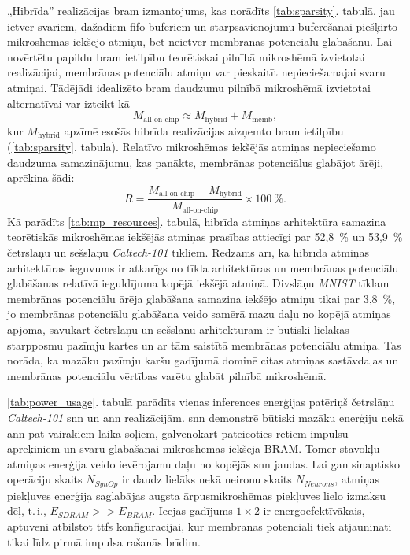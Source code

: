 „Hibrīda” realizācijas \Gls{bram} izmantojums, kas norādīts \ref{tab:sparsity}. tabulā, jau ietver svariem, dažādiem
\Gls{fifo} buferiem un starpsavienojumu buferēšanai piešķirto mikroshēmas iekšējo atmiņu, bet neietver membrānas potenciālu
glabāšanu. Lai novērtētu papildu \Gls{bram} ietilpību teorētiskai pilnībā mikroshēmā izvietotai realizācijai, membrānas
potenciālu atmiņu var pieskaitīt nepieciešamajai svaru atmiņai. Tādējādi idealizēto \Gls{bram} daudzumu pilnībā mikroshēmā
izvietotai alternatīvai var izteikt kā
\begin{equation}
  M_{\mathrm{all\mbox{-}on\mbox{-}chip}}
  \approx M_{\mathrm{hybrid}} + M_{\mathrm{memb}},
\end{equation}
kur \(M_{\mathrm{hybrid}}\) apzīmē esošās hibrīda realizācijas aizņemto \Gls{bram} ietilpību (\ref{tab:sparsity}. tabula).
Relatīvo mikroshēmas iekšējās atmiņas nepieciešamo daudzuma samazinājumu, kas panākts, membrānas potenciālus glabājot ārēji, aprēķina šādi:
\begin{equation}
  R =
  \frac{M_{\mathrm{all\mbox{-}on\mbox{-}chip}} - M_{\mathrm{hybrid}}}
       {M_{\mathrm{all\mbox{-}on\mbox{-}chip}}}
  \times 100~\%.
\end{equation}
Kā parādīts \ref{tab:mp_resources}. tabulā, hibrīda atmiņas arhitektūra samazina teorētiskās mikroshēmas iekšējās atmiņas
prasības attiecīgi par 52,8~\% un 53,9~\% četrslāņu un sešslāņu \textit{Caltech-101} tīkliem. Redzams arī, ka hibrīda atmiņas
arhitektūras ieguvums ir atkarīgs no tīkla arhitektūras un membrānas potenciālu glabāšanas relatīvā ieguldījuma kopējā
iekšējā atmiņā. Divslāņu \textit{MNIST} tīklam membrānas potenciālu ārēja glabāšana samazina iekšējo atmiņu tikai par 3,8~\%,
jo membrānas potenciālu glabāšana veido samērā mazu daļu no kopējā atmiņas apjoma, savukārt četrslāņu un sešslāņu
arhitektūrām ir būtiski lielākas starpposmu pazīmju kartes un ar tām saistītā membrānas potenciālu atmiņa. Tas norāda, ka
mazāku pazīmju karšu gadījumā dominē citas atmiņas sastāvdaļas un membrānas potenciālu vērtības varētu glabāt pilnībā
mikroshēmā.

\ref{tab:power_usage}. tabulā parādīts vienas inferences enerģijas patēriņš četrslāņu \textit{Caltech-101} \Gls{snn} un
\Gls{ann} realizācijām. \Gls{snn} demonstrē būtiski mazāku enerģiju nekā \Gls{ann} pat vairākiem laika soļiem, galvenokārt
pateicoties retiem impulsu aprēķiniem un svaru glabāšanai mikroshēmas iekšējā BRAM. Tomēr stāvokļu atmiņas enerģija veido ievērojamu daļu no kopējās \Gls{snn} jaudas. Lai gan sinaptisko operāciju skaits \(N_{SynOp}\) ir daudz lielāks nekā neironu skaits \(N_{Neurons}\), atmiņas piekļuves enerģija saglabājas augsta ārpusmikroshēmas piekļuves lielo izmaksu dēļ, t.\,i., \(E_{SDRAM} >> E_{BRAM}\). Ieejas gadījums \(1 \times 2\) ir energoefektīvākais, aptuveni atbilstot \Gls{ttfs} konfigurācijai, kur membrānas potenciāli tiek atjaunināti tikai līdz pirmā impulsa rašanās brīdim.

